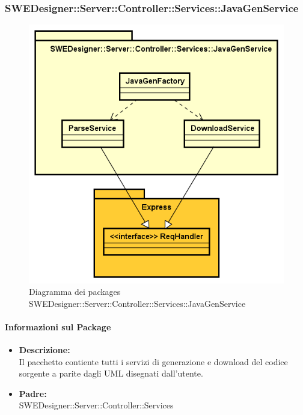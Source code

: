 		\subsubsection{SWEDesigner::Server::Controller::Services::JavaGenService}
		\begin{figure}[h!]
		\centering
		\includegraphics[scale=0.4]{Disegnetti/SWEDesigner__Server__Controller__Services__JavaGenService.png}
		\caption{Diagramma dei packages SWEDesigner::Server::Controller::Services::JavaGenService}
 		\end{figure}
		\paragraph{Informazioni sul Package}
		\begin{itemize}
			\item \textbf{Descrizione: }\\
			Il pacchetto contiente tutti i servizi di generazione e download del codice sorgente a parite dagli UML	disegnati dall'utente.
			\item \textbf{Padre: }\\ SWEDesigner::Server::Controller::Services
		\end{itemize}
